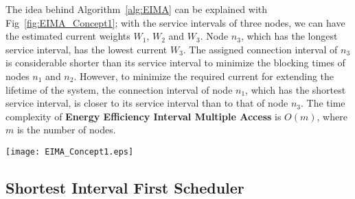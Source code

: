 \documentclass[10pt,journal,compsoc]{IEEEtran}
\begin{document}
The idea behind Algorithm~\ref{alg:EIMA} can be explained with Fig~\ref{fig:EIMA_Concept1}; with the service intervals of three nodes, we can have the estimated current weights $W_1$, $W_2$ and $W_3$. Node $n_3$, which has the longest service interval, has the lowest current $W_3$. The assigned connection interval of $n_3$ is considerable shorter than its service interval to minimize the blocking times of nodes $n_1$ and $n_2$. However, to minimize the required current for extending the lifetime of the system, the connection interval of node $n_1$, which has the shortest service interval, is closer to its service interval than to that of node $n_3$. The time complexity of {\bf Energy Efficiency Interval Multiple Access} is $O(m)$, where $m$ is the number of nodes.


\begin{figure*}[tbhp!!]
\begin{minipage}[b]{\linewidth}
\centering
{\texttt{[image: EIMA\_Concept1.eps]}}\vspace{-0.5em}
\caption{EIMA Concept} \label{fig:EIMA_Concept1} %
\end{minipage}
\end{figure*}



\subsection{Shortest Interval First Scheduler}\label{sec:EIF}
\end{document}

